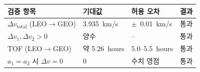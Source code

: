 \documentclass[11pt]{article}
\begin{document}
\begin{table}[htbp]
\centering
\begin{tabular}{@{}llll@{}}
\toprule
검증 항목 & 기대값 & 허용 오차 & 결과 \\
\midrule
$\Delta v_{\text{total}}$ (LEO$\rightarrow$GEO) & 3.935~km/s & $\pm$~0.01~km/s & 통과 \\
$\Delta v_1, \Delta v_2 > 0$ & 양수 & -- & 통과 \\
TOF (LEO$\rightarrow$GEO) & 약 5.26~hours & 5.0--5.5~hours & 통과 \\
$a_1 = a_2$ 시 $\Delta v = 0$ & 0 & 수치 영점 & 통과 \\
\bottomrule
\end{tabular}
\end{table}



\end{document}
